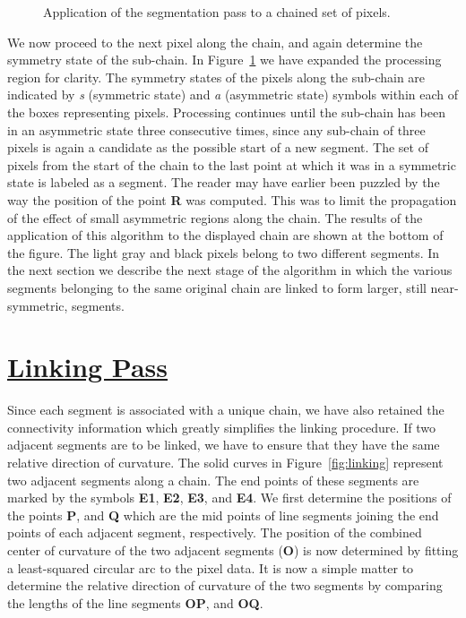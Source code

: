 \begin{figure}[htbp]
\vspace*{-10mm}
\vspace*{10cm}
\vspace*{-5mm}
\caption{Application of the segmentation pass to a chained set of pixels.}
\label{fig:segmentation}
\end{figure}

 We now proceed to the next pixel along the chain, and again determine the 
symmetry state of the sub-chain. In Figure~\ref{fig:segmentation} we have
expanded the processing region for clarity. The symmetry states of the pixels 
along the sub-chain are indicated by {\it s} (symmetric state) and {\it a} 
(asymmetric state) symbols within each of the boxes representing pixels. 
Processing continues until the sub-chain has been in an asymmetric state three
consecutive times, since any sub-chain of three pixels is again a candidate 
as the possible start of a new segment. The set of pixels from the start 
of the chain to the last point at which it was in a symmetric state is labeled 
as a segment. The reader may have earlier been puzzled by the way the position 
of the point {\bf R} was computed. This was to limit the propagation of the 
effect of small asymmetric regions along the chain. The results of the 
application of this algorithm to the displayed chain are shown at the bottom 
of the figure. The light gray and black pixels belong to two different 
segments. In the next section we describe the next stage of the algorithm in 
which the various segments belonging to the same original chain are linked to 
form larger, still near-symmetric, segments.

\section{\underline{Linking Pass}}

 Since each segment is associated with a unique chain, we have also retained 
the connectivity information which greatly simplifies the linking procedure.  
If two adjacent segments are to be linked, we have to ensure that they 
have the same relative direction of curvature. The solid curves in 
Figure~\ref{fig:linking} represent two adjacent segments along a chain. 
The end points of these segments are marked by the symbols {\bf E1}, {\bf E2}, 
{\bf E3}, and {\bf E4}. We first determine the positions of the points 
{\bf P}, and {\bf Q} which are the mid points of line segments joining the end 
points of each adjacent segment, respectively. The position of the combined 
center of curvature of the two adjacent segments ({\bf O}) is now determined 
by fitting a least-squared circular arc to the pixel data. It is now a simple 
matter to determine the relative direction of curvature of the two segments by 
comparing the lengths of the line segments {\bf OP}, and {\bf OQ}. 

